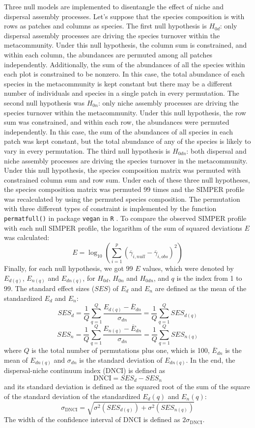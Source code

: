Three null models are implemented to disentangle the effect of niche and dispersal assembly processes. Let's suppose that the species composition is with rows as patches and columns as species. The first null hypothesis is $H_{0d}$: only dispersal assembly processes are driving the species turnover within the metacommunity. Under this null hypothesis, the column sum is constrained, and within each column, the abundances are permuted among all patches independently. Additionally, the sum of the abundances of all the species within each plot is constrained to be nonzero. In this case, the total abundance of each species in the metacommunity is kept constant but there may be a different number of individuals and species in a single patch in every permutation. The second null hypothesis was $H_{0n}$: only niche assembly processes are driving the species turnover within the metacommunity. Under this null hypothesis, the row sum was constrained, and within each row, the abundances were permuted independently. In this case, the sum of the abundances of all species in each patch was kept constant, but the total abundance of any of the species is likely to vary in every permutation. The third null hypothesis is $H_{0dn}$: both dispersal and niche assembly processes are driving the species turnover in the metacommunity. Under this null hypothesis, the species composition matrix was permuted with constrained column sum and row sum. Under each of these three null hypotheses, the species composition matrix was permuted 99 times and the SIMPER profile was recalculated by using the permuted species composition. The permutation with three different types of constraint is implemented by the function \texttt{permatfull()} in package \texttt{vegan} in \texttt{R} \citep{R}. To compare the observed SIMPER profile with each null SIMPER profile, the logarithm of the sum of squared deviations $E$ was calculated: 
\[
E = \log_{10}(\sum_{i=1}^p(\overline{\gamma}_{i,null} - \overline{\gamma}_{i,obs})^2)
\]
Finally, for each null hypothesis, we got 99 $E$ values, which were denoted by $E_{d(q)}$, $E_{n(q)}$ and $E_{dn(q)}$, for $H_{0d}$, $H_{0n}$ and $H_{0dn}$, and $q$ is the index from 1 to 99. The standard effect sizes ($SES$) of $E_d$ and $E_n$ are defined as the mean of the standardized $E_d$ and $E_n$:
\[
SES_d = \frac{1}{Q}\sum_{q=1}^Q \dfrac{E_{d(q)} - \overline{E}_{dn}}{\sigma_{dn}} = \frac{1}{Q}\sum_{q=1}^Q SES_{d(q)}
\]
\[
SES_n = \frac{1}{Q}\sum_{q=1}^Q \dfrac{E_{n(q)} - \overline{E}_{dn}}{\sigma_{dn}} = \frac{1}{Q}\sum_{q=1}^Q SES_{n(q)}
\]
where $Q$ is the total number of permutations plus one, which is 100, $\overline{E}_{dn}$ is the mean of $E_{dn(q)}$ and $\sigma_{dn}$ is the standard deviation of $E_{dn(q)}$. In the end, the dispersal-niche continuum index (DNCI) is defined as
\[
\text{DNCI} = SES_d - SES_n
\]
and its standard deviation is defined as the squared root of the sum of the square of the standard deviation of the standardized $E_d(q)$ and $E_n(q)$:
\[
\sigma_{\text{DNCI}} = \sqrt{\sigma^2(SES_{d(q)}) + \sigma^2(SES_{n(q)})}
\]
The width of the confidence interval of DNCI is defined as $2\sigma_{\text{DNCI}}$.


